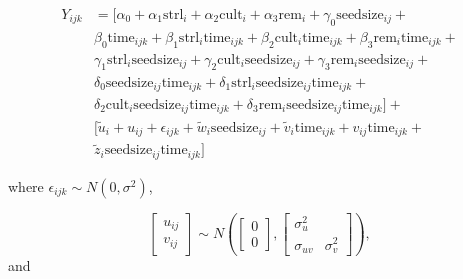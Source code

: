 \documentclass[
]{krantz}
\begin{document}
\begin{align*}
Y_{ijk} & = [\alpha_{0}+\alpha_{1}\textrm{strl}_{i}+\alpha_{2}\textrm{cult}_{i}+\alpha_{3}\textrm{rem}_{i} +
 \gamma_{0}\textrm{seedsize}_{ij} + \\
 & \beta_{0}\textrm{time}_{ijk} + \beta_{1}\textrm{strl}_{i}\textrm{time}_{ijk}+\beta_{2}\textrm{cult}_{i}\textrm{time}_{ijk}+ \beta_{3}\textrm{rem}_{i}\textrm{time}_{ijk} + \\
 & \gamma_{1}\textrm{strl}_{i}\textrm{seedsize}_{ij}+\gamma_{2}\textrm{cult}_{i}\textrm{seedsize}_{ij}+ \gamma_{3}\textrm{rem}_{i}\textrm{seedsize}_{ij} + \\
 & \delta_{0}\textrm{seedsize}_{ij}\textrm{time}_{ijk} + \delta_{1}\textrm{strl}_{i}\textrm{seedsize}_{ij}\textrm{time}_{ijk} + \\
 & \delta_{2}\textrm{cult}_{i}\textrm{seedsize}_{ij}\textrm{time}_{ijk} + \delta_{3}\textrm{rem}_{i}\textrm{seedsize}_{ij}\textrm{time}_{ijk}] + \\
 & [\tilde{u}_{i} + u_{ij} + \epsilon_{ijk} + \tilde{w}_{i}\textrm{seedsize}_{ij} + \tilde{v}_{i}\textrm{time}_{ijk} + v_{ij}\textrm{time}_{ijk} + \\ 
 & \tilde{z}_{i}\textrm{seedsize}_{ij}\textrm{time}_{ijk} ]
\end{align*}

where \(\epsilon_{ijk}\sim N(0,\sigma^2)\),

\[ \left[ \begin{array}{c}
            u_{ij} \\ v_{ij}
          \end{array}  \right] \sim N \left( \left[
          \begin{array}{c}
            0 \\ 0
          \end{array} \right], \left[
          \begin{array}{cc}
            \sigma_{u}^{2} & \\
            \sigma_{uv} & \sigma_{v}^{2}
          \end{array} \right] \right), \] and
\end{document}
